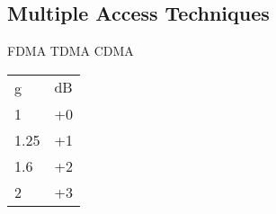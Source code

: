\documentclass[fs, footer]{latex4ei}
\begin{document}
\begin{multicols*}{4}
	


	\subsection{Multiple Access Techniques}
	FDMA
	TDMA
	CDMA


	\begin{tabular}{ll}
	g & $\si{\dB}$\\
	1 & +0\\
	1.25 & +1\\
	1.6 & +2\\
	2 & +3\\
	\end{tabular}

\end{multicols*}

\end{document}
